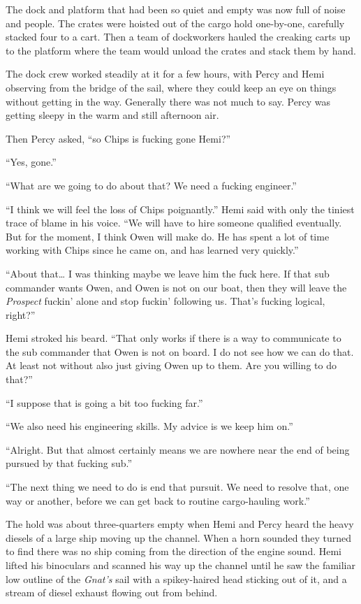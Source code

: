 \documentclass[]{scrbook}
\begin{document}
The dock and platform that had been so quiet and empty was now full of
noise and people. The crates were hoisted out of the cargo hold
one-by-one, carefully stacked four to a cart. Then a team of dockworkers
hauled the creaking carts up to the platform where the team would unload
the crates and stack them by hand.

The dock crew worked steadily at it for a few hours, with Percy and Hemi
observing from the bridge of the sail, where they could keep an eye on
things without getting in the way. Generally there was not much to say.
Percy was getting sleepy in the warm and still afternoon air.

Then Percy asked, ``so Chips is fucking gone Hemi?''

``Yes, gone.''

``What are we going to do about that? We need a fucking engineer.''

``I think we will feel the loss of Chips poignantly.'' Hemi said with
only the tiniest trace of blame in his voice. ``We will have to hire
someone qualified eventually. But for the moment, I think Owen will make
do. He has spent a lot of time working with Chips since he came on, and
has learned very quickly.''

``About that\ldots{} I was thinking maybe we leave him the fuck here. If
that sub commander wants Owen, and Owen is not on our boat, then they
will leave the \emph{Prospect} fuckin' alone and stop fuckin' following
us. That's fucking logical, right?''

Hemi stroked his beard. ``That only works if there is a way to
communicate to the sub commander that Owen is not on board. I do not see
how we can do that. At least not without also just giving Owen up to
them. Are you willing to do that?''

``I suppose that is going a bit too fucking far.''

``We also need his engineering skills. My advice is we keep him on.''

``Alright. But that almost certainly means we are nowhere near the end
of being pursued by that fucking sub.''

``The next thing we need to do is end that pursuit. We need to resolve
that, one way or another, before we can get back to routine
cargo-hauling work.''

The hold was about three-quarters empty when Hemi and Percy heard the
heavy diesels of a large ship moving up the channel. When a horn sounded
they turned to find there was no ship coming from the direction of the
engine sound. Hemi lifted his binoculars and scanned his way up the
channel until he saw the familiar low outline of the \emph{Gnat's} sail
with a spikey-haired head sticking out of it, and a stream of diesel
exhaust flowing out from behind.
\end{document}
